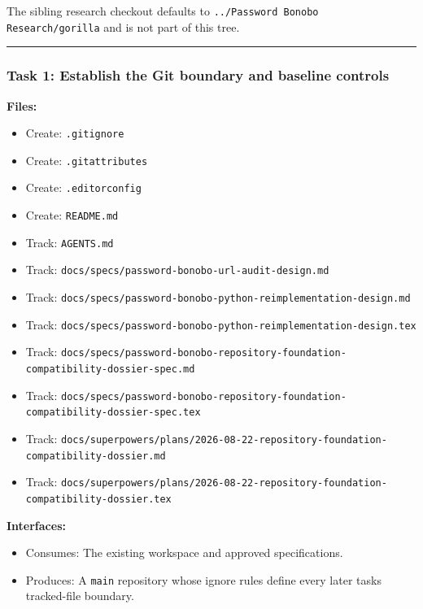 \documentclass[
  letterpaper,
]{article}
\newcommand{\passthrough}[1]{#1}
\providecommand{\tightlist}{%
  \setlength{\itemsep}{0pt}\setlength{\parskip}{0pt}}
\begin{document}
The sibling research checkout defaults to \passthrough{\lstinline!../Password Bonobo Research/gorilla!} and is not part
of this tree.

\begin{center}\rule{0.5\linewidth}{0.5pt}\end{center}

\subsubsection{Task 1: Establish the Git boundary and baseline
controls}\label{task-1-establish-the-git-boundary-and-baseline-controls}

\textbf{Files:}

\begin{itemize}
\tightlist
\item
  Create: \nolinkurl{.gitignore}
\item
  Create: \nolinkurl{.gitattributes}
\item
  Create: \nolinkurl{.editorconfig}
\item
  Create: \passthrough{\lstinline!README.md!}
\item
  Track: \passthrough{\lstinline!AGENTS.md!}
\item
  Track: \nolinkurl{docs/specs/password-bonobo-url-audit-design.md}
\item
  Track: \nolinkurl{docs/specs/password-bonobo-python-reimplementation-design.md}
\item
  Track: \nolinkurl{docs/specs/password-bonobo-python-reimplementation-design.tex}
\item
  Track: \nolinkurl{docs/specs/password-bonobo-repository-foundation-compatibility-dossier-spec.md}
\item
  Track: \nolinkurl{docs/specs/password-bonobo-repository-foundation-compatibility-dossier-spec.tex}
\item
  Track: \nolinkurl{docs/superpowers/plans/2026-08-22-repository-foundation-compatibility-dossier.md}
\item
  Track: \nolinkurl{docs/superpowers/plans/2026-08-22-repository-foundation-compatibility-dossier.tex}
\end{itemize}

\textbf{Interfaces:}

\begin{itemize}
\tightlist
\item
  Consumes: The existing workspace and approved specifications.
\item
  Produces: A \passthrough{\lstinline!main!} repository whose ignore rules define every later task\textquotesingle s
  tracked-file boundary.
\end{itemize}
\end{document}
